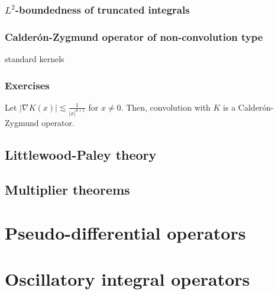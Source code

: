 \documentclass{../note}
\begin{document}
\section{$L^2$-boundedness of truncated integrals}

\section{Calder\'on-Zygmund operator of non-convolution type}
standard kernels



\section*{Exercises}
\begin{prb}
Let $|\nabla K(x)|\lesssim\frac1{|x|^{d+1}}$ for $x\ne0$.
Then, convolution with $K$ is a Calder\'on-Zygmund operator.
\end{prb}




\chapter{Littlewood-Paley theory}
\chapter{Multiplier theorems}

\part{Pseudo-differential operators}


\part{Oscillatory integral operators}
\end{document}
